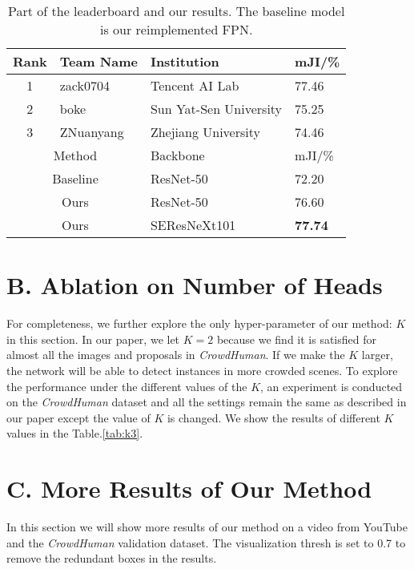 \documentclass[10pt,twocolumn,letterpaper]{article}
\begin{document}
\begin{table}[htp]
   \begin{center}
   \begin{tabular}{c|l|l|p{8mm}<{\centering}}
   \hline\hline
   Rank &Team Name&Institution&mJI/\%\\
   \hline\hline
   1 & zack0704 & Tencent AI Lab & 77.46 \\
   2 & boke & Sun Yat-Sen University & 75.25 \\
   3 & ZNuanyang & Zhejiang University & 74.46 \\
   \hline\hline
   \multicolumn{2}{c|}{Method} & Backbone & mJI/\%\\
   \hline\hline
   \multicolumn{2}{c|}{Baseline} & ResNet-50 & 72.20 \\
   \hline
   \multicolumn{2}{c|}{Ours} & ResNet-50  & 76.60\\
   \multicolumn{2}{c|}{Ours} & SEResNeXt101 & {\bf 77.74}\\
   \hline
   \end{tabular}
   \end{center}
   \caption{Part of the leaderboard and our results. 
   The baseline model is our reimplemented FPN\cite{lin2017feature}.}
   \label{tab:ledaerboard}
\end{table}

\section*{B. Ablation on Number of Heads}
For completeness, we further explore the only hyper-parameter of our method: $K$
in this section.
In our paper, we let $K=2$ because we find it is satisfied for almost all the images
and proposals in \emph{CrowdHuman}.
If we make the $K$ larger, the network will be able to detect instances in more 
crowded scenes.
To explore the performance under the different values of the $K$, an experiment is 
conducted on the \emph{CrowdHuman} dataset and all the settings remain the same as 
described in our paper except the value of $K$ is changed.
We show the results of different $K$ values in the Table.\ref{tab:k3}.

\section*{C. More Results of Our Method}
In this section we will show more results of our method on a video from YouTube and 
the \emph{CrowdHuman} validation dataset.
The visualization thresh is set to 0.7 to remove the redundant boxes in the results.
\end{document}
